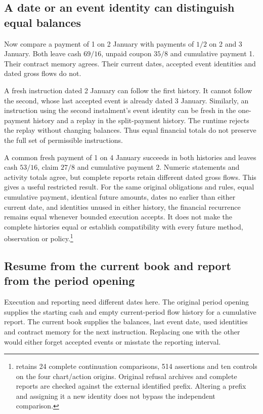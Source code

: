 \subsection{A date or an event identity can distinguish equal balances}

Now compare a payment of 1 on 2 January with payments of $1/2$ on 2 and 3 January. Both leave cash $69/16$, unpaid coupon $35/8$ and cumulative payment 1. Their contract memory agrees. Their current dates, accepted event identities and dated gross flows do not.

A fresh instruction dated 2 January can follow the first history. It cannot follow the second, whose last accepted event is already dated 3 January. Similarly, an instruction using the second instalment's event identity can be fresh in the one-payment history and a replay in the split-payment history. The runtime rejects the replay without changing balances. Thus equal financial totals do not preserve the full set of permissible instructions.

A common fresh payment of 1 on 4 January succeeds in both histories and leaves cash $53/16$, claim $27/8$ and cumulative payment 2. Numeric statements and activity totals agree, but complete reports retain different dated gross flows. This gives a useful restricted result. For the same original obligations and rules, equal cumulative payment, identical future amounts, dates no earlier than either current date, and identities unused in either history, the financial recurrence remains equal whenever bounded execution accepts. It does not make the complete histories equal or establish compatibility with every future method, observation or policy.\footnote{ retains 24 complete continuation comparisons, 514 assertions and ten controls on the four chart/action origins. Original refusal archives and complete reports are checked against the external identified prefix. Altering a prefix and assigning it a new identity does not bypass the independent comparison.}

\subsection{Resume from the current book and report from the period opening}

Execution and reporting need different dates here. The original period opening supplies the starting cash and empty current-period flow history for a cumulative report. The current book supplies the balances, last event date, used identities and contract memory for the next instruction. Replacing one with the other would either forget accepted events or misstate the reporting interval.

